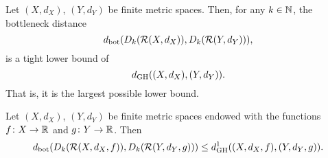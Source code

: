 \begin{proposition}
    Let $ (X, d_X) $, $ (Y, d_Y) $ be finite metric spaces. Then, for any $ k \in \mathbb N$, the bottleneck distance
    $$
        d_{\operatorname{bot}}(D_k(\mathcal{R}(X, d_X)), D_k(\mathcal{R}(Y, d_Y))),
    $$
    is a tight lower bound of
    $$
        d_{\operatorname{GH}}((X, d_X), (Y, d_Y)).
    $$
    That is, it is the largest possible lower bound.
\end{proposition}

\begin{theorem}
    Let $ (X, d_X) $, $ (Y, d_Y) $ be finite metric spaces endowed with the functions $ f \colon X \to \mathbb R $ and $ g \colon Y \to \mathbb R $. Then
    $$
        d_{\operatorname{bot}}(D_k(\mathcal{R}(X, d_X, f)), D_k(\mathcal{R}(Y, d_Y, g))) \leq d_{\operatorname{GH}}^1((X, d_X, f), (Y, d_Y, g)).
    $$
\end{theorem}